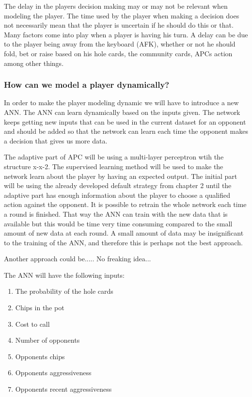 The delay in the players decision making may or may not be relevant when modeling the player. The time used by the player when making a decision does not necessarily mean that the player is uncertain if he should do this or that. Many factors come into play when a player is having his turn. A delay can be due to the player being away from the keyboard (AFK), whether or not he should fold, bet or raise based on his hole cards, the community cards, APCs action among other things. 
\\

\subsubsection{How can we model a player dynamically?}
In order to make the player modeling dynamic we will have to introduce a new ANN. The ANN can learn dynamically based on the inputs given. The network keeps getting new inputs that can be used in the current dataset for an opponent and should be added so that the network can learn each time the opponent makes a decision that gives us more data.

The adaptive part of APC will be using a multi-layer perceptron wtih the structure x-x-2. The supervised learning method will be used to make the network learn about the player by having an expected output. The initial part will be using the already developed default strategy from chapter 2 until the adaptive part has enough information about the player to choose a qualified action against the opponent.
It is possible to retrain the whole network each time a round is finished. That way the ANN can train with the new data that is available but this would be time very time consuming compared to the small amount of new data at each round.
A small amount of data may be insignificant to the training of the ANN, and therefore this is perhaps not the best approach.

Another approach could be..... No freaking idea...

The ANN will have the following inputs:

\begin{enumerate}
  \item The probability of the hole cards
  \item Chips in the pot
  \item Cost to call
  \item Number of opponents
  \item Opponents chips
  \item Opponents aggressiveness
  \item Opponents recent aggressiveness
\end{enumerate}


